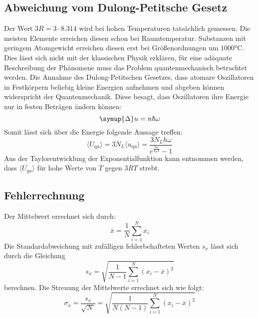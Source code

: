 \subsection{Abweichung vom Dulong-Petitsche Gesetz}
Der Wert $3R = 3\cdot8.314$ \cite{codata} wird bei hohen Temperaturen tatsächlich gemessen.
Die meisten Elemente erreichen diesen schon bei Raumtemperatur.
Substanzen mit geringem Atomgewicht erreichen diesen erst bei
Größenordnungen um $1000\si{\celsius}$.
Dies lässt sich nicht mit der klassischen Physik erklären,
für eine adäquate Beschreibung der Phänomene muss
das Problem quantenmechanisch betrachtet werden.
Die Annahme des Dulong-Petitschen Gesetzes, dass atomare Oszillatoren in Festkörpern
beliebig kleine Energien aufnehmen und abgeben können widerspricht der Quantenmechanik.
Diese besagt, dass Oszillatoren ihre Energie nur in festen Beträgen ändern können:
\begin{equation}
\symup{\Delta} u = n \hbar \omega
\end{equation}
Somit lässt sich über die Energie folgende Aussage treffen:
\begin{equation}
\langle U_\text{qu} \rangle = 3 N_L \langle u_\text{qu} \rangle = \frac{3 N_L h
\omega}{e^{\frac{h\omega}{k_\text{B}T}}-1}
\end{equation}
Aus der Taylorentwicklung der Exponentialfunktion kann entnommen werden,
dass $\langle U_{qu} \rangle$ für hohe Werte von $T$ gegen $3RT$ strebt.
\subsection{Fehlerrechnung}
Der Mittelwert errechnet sich durch:
\begin{equation}
\label{eq:mittel}
\overline{x}=\frac{1}{N}\sum \limits_{i=1}^N x_i
\end{equation}
Die Standardabweichung mit zufälligen fehlerbehafteten Werten $s_x$ lässt sich durch die Gleichung
\begin{equation}
\label{eq:standard}
s_x=\sqrt{\frac{1}{N-1}\sum \limits_{i=1}^N \left(x_i-\overline{x}\right)^2}
\end{equation}
berechnen.
Die Streuung der Mittelwerte errechnet sich wie folgt:
\begin{equation}
\label{eq:streuung}
\sigma_x=\frac{s_x}{\sqrt{\!N\,}}=\sqrt{\frac{1}{N(N-1)}\sum \limits_{i=1}^N \left(x_i-\overline{x}\right)^2}
\end{equation}
